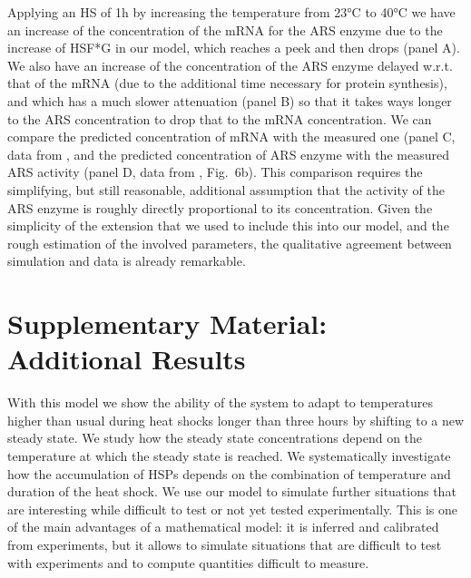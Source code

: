 \documentclass[oneside, 10pt, a4paper, twocolumn]{article}
\begin{document}
Applying an HS of 1h by increasing the temperature from 23°C to 40°C we have an increase of the concentration of the mRNA for the ARS enzyme due to the increase of HSF*G in our model, which reaches a peek and then drops (panel A). We also have an increase of the concentration of the ARS enzyme delayed w.r.t. that of the mRNA (due to the additional time necessary for protein synthesis), and which has a much slower attenuation (panel B) so that it takes ways longer to the ARS concentration to drop that to the mRNA concentration. We can compare the predicted concentration of mRNA with the measured one (panel C, data from \cite{Schroda2000}, and the predicted concentration of ARS enzyme with the measured ARS activity (panel D, data from \cite{Schroda2000}, Fig.~6b). This comparison requires the simplifying, but still reasonable, additional assumption that the activity of the ARS enzyme is roughly directly proportional to its concentration. 
Given the simplicity of the extension that we used to include this into our model, and the rough estimation of the involved parameters, the qualitative agreement between simulation and data is already remarkable. 





\section{Supplementary Material: Additional Results}
\label{SectionFurtherPredictions}
With 
this model 
we show the ability of the system to adapt to temperatures higher than usual 
during heat shocks longer than three hours 
by shifting to a new steady state. We study how the steady state concentrations depend on the temperature at which the steady state is reached. 
We systematically investigate how the accumulation 
of HSPs depends on the combination of temperature and duration of the heat shock. 
We use our model to simulate further situations that are interesting while difficult to test or not yet tested experimentally. This is one of the main advantages of a mathematical model: it is inferred and calibrated from experiments, but it allows to simulate situations that are difficult to test with experiments and to compute quantities difficult to measure.
\end{document}
